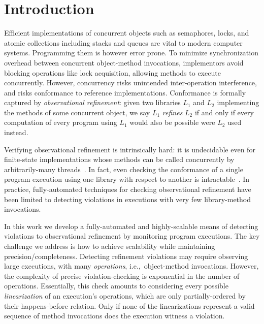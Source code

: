 \section{Introduction}
\label{sec:intro}

Efficient implementations of concurrent objects such as semaphores, locks, and
atomic collections including stacks and queues are vital to modern computer
systems. Programming them is however error prone. To minimize synchronization
overhead between concurrent object-method invocations, implementors avoid
blocking operations like lock acquisition, allowing methods to execute
concurrently. However, concurrency risks unintended inter-operation
interference, and risks conformance to reference implementations. Conformance
is formally captured by \emph{observational refinement}: given two libraries
$L_1$ and $L_2$ implementing the methods of some concurrent object, we say
$L_1$ \emph{refines} $L_2$ if and only if every computation of every program
using $L_1$ would also be possible were $L_2$ used instead.

Verifying observational refinement is intrinsically hard: it is undecidable
even for finite-state implementations whose methods can be called concurrently
by arbitrarily-many threads~\cite{conf/esop/BouajjaniEEH13}. In fact, even
checking the conformance of a single program execution using one library with
respect to another is intractable~\cite{journals/siamcomp/GibbonsK97}. In
practice, fully-automated techniques for checking observational refinement have
been limited to detecting violations in executions with very few library-method
invocations.

In this work we develop a fully-automated and highly-scalable means of
detecting violations to observational refinement by monitoring program
executions. The key challenge we address is how to achieve scalability while
maintaining precision/completeness. Detecting refinement violations may require
observing large executions, with many \emph{operations}, i.e.,~object-method
invocations. However, the complexity of precise violation-checking is
exponential in the number of operations. Essentially, this check amounts to
considering every possible \emph{linearization} of an execution's operations,
which are only partially-ordered by their happens-before relation. Only if none
of the linearizations represent a valid sequence of method invocations does the
execution witness a violation.

